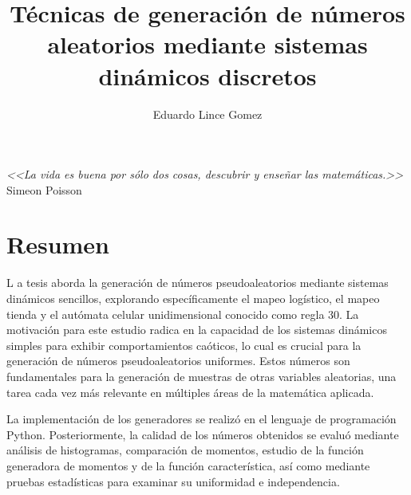 \documentclass[letterpaper,spanish,12pt]{book}
\author{Eduardo Lince Gomez}
\title{Técnicas de generación
de números aleatorios mediante sistemas dinámicos discretos}
\newcommand{\chapteropening}[3][]{%
\lettrine[lines=2,lhang=0.25,nindent=8pt,#1]{#2}{\MakeLowercase{#3}}%
}
\theoremstyle{remark}
\begin{document}
\frontmatter
\maketitle %

\chapter*{}
\begin{flushright}
	{%
	\selectfont\emph{<<La vida es buena por sólo dos cosas, descubrir y enseñar las matemáticas.>>}\\
\vspace{5mm}
	Simeon Poisson}

\end{flushright}
\vfill
\chapter{Resumen}
\chapteropening{L}{}\MakeLowercase{a} tesis aborda la generación de números pseudoaleatorios mediante sistemas dinámicos sencillos, explorando específicamente el mapeo logístico, el mapeo tienda y el autómata celular unidimensional conocido como regla 30. La motivación para este estudio radica en la  capacidad de los sistemas dinámicos simples para exhibir comportamientos caóticos, lo cual es crucial para la generación de números pseudoaleatorios uniformes. Estos números son fundamentales para la generación de muestras de otras variables aleatorias, una tarea cada vez más relevante en múltiples áreas de la matemática aplicada.

La implementación de los generadores se realizó en el lenguaje de programación Python. Posteriormente, la calidad de los números obtenidos se evaluó mediante análisis de histogramas, comparación de momentos, estudio de la función generadora de momentos y de la función característica, así como mediante pruebas estadísticas para examinar su uniformidad e independencia.
\end{document}
